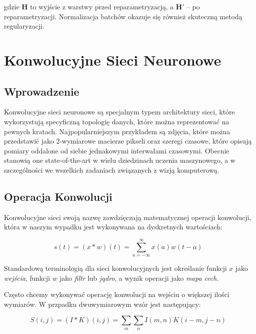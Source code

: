 \documentclass[licencjacka]{pracamgr}
\begin{document}
gdzie $ \mathbf{H} $ to wyjście z warstwy przed reparametryzacją, a $ \mathbf{H'} $ -- po reparametryzacji. Normalizacja batchów okazuje się również skuteczną metodą regularyzacji.

\section{Konwolucyjne Sieci Neuronowe}

\subsection{Wprowadzenie}

Konwolucyjne sieci neuronowe są specjalnym typem architektury sieci, które wykorzystują specyficzną topologię danych, które można reprezentować na pewnych kratach. Najpopularniejszym przykładem są zdjęcia, które można przedstawić jako 2-wymiarowe macierze pikseli oraz szeregi czasowe, które opisują pomiary oddalone od siebie jednakowymi interwałami czasowymi. Obecnie stanowią one state-of-the-art w wielu dziedzinach uczenia maszynowego, a w szczególności we wszelkich zadaniach związanych z wizją komputerową. 

\subsection{Operacja Konwolucji}

Konwolucyjne sieci swoją nazwę zawdzięczają matematycznej operacji konwolucji, która w naszym wypadku jest wykonywana na dyskretnych wartościach:

$$ s(t) = (x * w)(t) = \sum_{a = -\infty}^{\infty} x(a)w(t - a) $$

Standardową terminologią dla sieci konwolucyjnych jest określanie funkcji $x$ jako \emph{wejścia}, funkcji $w$ jako \emph{filtr} lub \emph{jądro}, a wynik operacji jako \emph{mapa cech}.

Często chcemy wykonywać operację konwolucji na wejściu o większej ilości wymiarów. W przpadku dwuwymiarowym wzór jest następujący:

$$ S(i, j) = (I * K)(i, j) = \sum_m \sum_n I(m, n) K(i - m, j - n) $$
\end{document}
